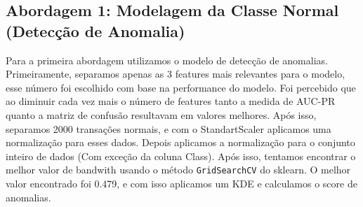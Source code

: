 \documentclass[a4paper,12pt]{article}
\begin{document}
\subsection{Abordagem 1: Modelagem da Classe Normal (Detecção de Anomalia)}
\label{subsec:abordagem1}
  Para a primeira abordagem utilizamos o modelo de detecção de anomalias. Primeiramente, separamos apenas as 3 features mais relevantes para o modelo, esse número foi escolhido com base na performance do modelo. Foi percebido que ao diminuir cada vez mais o número de features tanto a medida de AUC-PR quanto a matriz de confusão resultavam em valores melhores. Após isso, separamos 2000 transações normais, e com o StandartScaler aplicamos uma normalização para esses dados. Depois aplicamos a normalização para o conjunto inteiro de dados (Com exceção da coluna Class). Após isso, tentamos encontrar o melhor valor de bandwith usando o método \texttt{GridSearchCV} do sklearn. O melhor valor encontrado foi 0.479, e com isso aplicamos um KDE e calculamos o score de anomalias.
\end{document}
